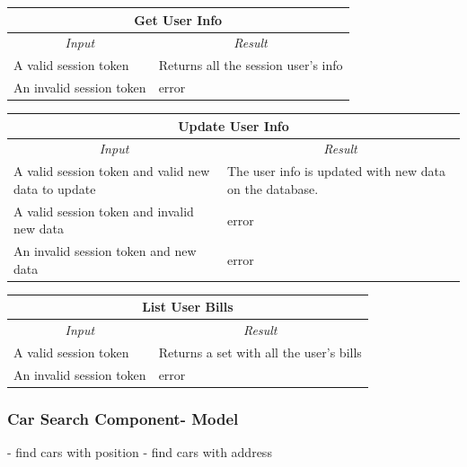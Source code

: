 \documentclass[english]{article}
\begin{document}
\begin{center}

	\begin{tabular}{ | p{6cm} | p{6cm} | }
		\hline 
		\multicolumn{2}{|c|}{\textbf{Get User Info}} \\
		\hline
		\multicolumn{1}{|c|}{\textit{Input}} & \multicolumn{1}{c|}{\textit{Result}} \\
		\hline
		A valid session token & Returns all the session user's info \\
		\hline
		An invalid session token & error \\
		\hline
	\end{tabular}
\end{center}

\begin{center}

	\begin{tabular}{ | p{6cm} | p{6cm} | }
		\hline 
		\multicolumn{2}{|c|}{\textbf{Update User Info}} \\
		\hline
		\multicolumn{1}{|c|}{\textit{Input}} & \multicolumn{1}{c|}{\textit{Result}} \\
		\hline
		A valid session token and valid new data to update & The user info is updated with new data on the database. \\
		\hline
		A valid session token and invalid new data & error \\
		\hline
		An invalid session token and new data & error \\
		\hline
	\end{tabular}
\end{center}

\begin{center}

	\begin{tabular}{ | p{6cm} | p{6cm} | }
		\hline 
		\multicolumn{2}{|c|}{\textbf{List User Bills}} \\
		\hline
		\multicolumn{1}{|c|}{\textit{Input}} & \multicolumn{1}{c|}{\textit{Result}} \\
		\hline
		A valid session token & Returns a set with all the user's bills \\
		\hline
		An invalid session token & error \\
		\hline
	\end{tabular}
\end{center}

\subsubsection{Car Search Component- Model}
- find cars with position
- find cars with address
\end{document}
